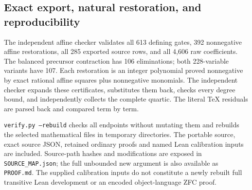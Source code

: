 \subsection{Exact export, natural restoration, and reproducibility}
The independent affine checker validates all 613 defining gates,
392 nonnegative affine restorations, all 285 exported source rows,
and all 4,606 raw coefficients. The balanced precursor contraction has 106
eliminations; both 228-variable variants have 107. Each restoration
is an integer polynomial proved nonnegative by exact rational affine
squares plus nonnegative monomials. The independent checker expands
these certificates, substitutes them back, checks every degree bound,
and independently collects the complete quartic. The literal TeX
residuals are parsed back and compared term by term.

\texttt{verify.py --rebuild} checks all endpoints without mutating them
and rebuilds the selected mathematical files in temporary directories.
The portable source, exact source JSON, retained ordinary proofs and
named Lean calibration inputs are included. Source-path hashes and
modifications are exposed in \texttt{SOURCE\_MAP.json}; the full
unbounded new argument is also available as \texttt{PROOF.md}.
The supplied calibration inputs do not constitute a newly rebuilt full
transitive Lean development or an encoded object-language ZFC proof.
